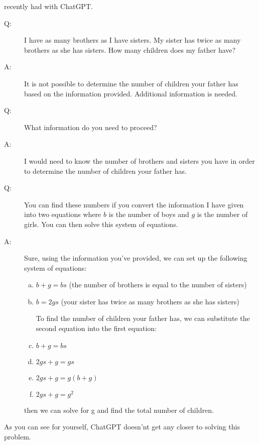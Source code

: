 \begin{enumerate}
      recently had with ChatGPT.
      \begin{description}
       \item[Q:] I have as many brothers as I have sisters.  My sister has twice as many brothers as she has
                 sisters.  How many children does my father have?  
       \item[A:] It is not possible to determine the number of children your father has based on the
                 information provided. Additional information is needed.        
       \item[Q:] What information do you need to proceed?
       \item[A:] I would need to know the number of brothers and sisters you have in order to determine the
                 number of children your father has.  
       \item[Q:] You can find these numbers if you convert the information I have given into two equations
                 where $b$ is the number of boys and $g$ is the number of girls.  You can then solve this
                 system of equations.    
       \item[A:] Sure, using the information you've provided, we can set up the following system of equations:
                \begin{enumerate}[(a)]
                \item $b + g = bs$ (the number of brothers is equal to the number of sisters)
                \item $b = 2gs$ (your sister has twice as many brothers as she has sisters)

                      To find the number of children your father has, we can substitute the second equation into
                      the first equation: 
                \item $b + g = bs$
                \item $2gs + g = gs$
                \item $2gs + g = g (b + g)$
                \item $2gs + g = g^2$
                \end{enumerate}
                then we can solve for g and find the total number of children.
      \end{description}
      As you can see for yourself, ChatGPT doesn'nt get any closer to solving this problem.
      

\end{enumerate}
